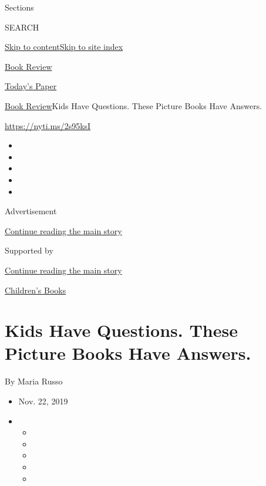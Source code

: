 Sections

SEARCH

\protect\hyperlink{site-content}{Skip to
content}\protect\hyperlink{site-index}{Skip to site index}

\href{https://www.nytimes3xbfgragh.onion/section/books/review}{Book
Review}

\href{https://myaccount.nytimes3xbfgragh.onion/auth/login?response_type=cookie\&client_id=vi}{}

\href{https://www.nytimes3xbfgragh.onion/section/todayspaper}{Today's
Paper}

\href{/section/books/review}{Book Review}\textbar{}Kids Have Questions.
These Picture Books Have Answers.

\url{https://nyti.ms/2s95ksI}

\begin{itemize}
\item
\item
\item
\item
\item
\end{itemize}

Advertisement

\protect\hyperlink{after-top}{Continue reading the main story}

Supported by

\protect\hyperlink{after-sponsor}{Continue reading the main story}

\href{/column/childrens-books}{Children's Books}

\hypertarget{kids-have-questions-these-picture-books-have-answers}{%
\section{Kids Have Questions. These Picture Books Have
Answers.}\label{kids-have-questions-these-picture-books-have-answers}}

By Maria Russo

\begin{itemize}
\item
  Nov. 22, 2019
\item
  \begin{itemize}
  \item
  \item
  \item
  \item
  \item
  \end{itemize}
\end{itemize}

